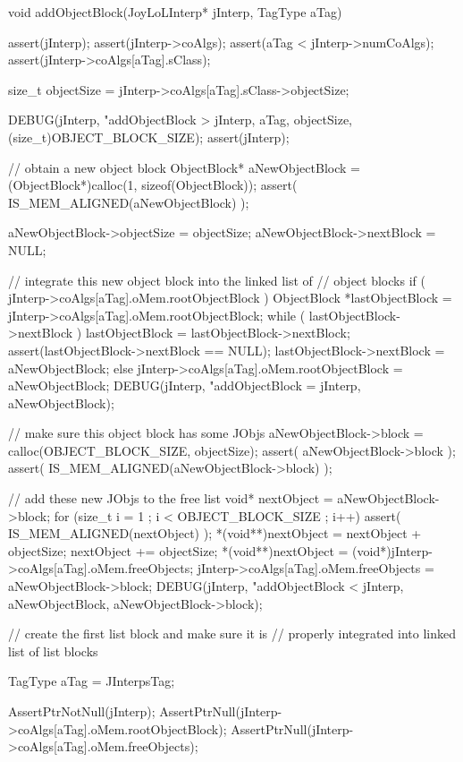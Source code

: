 \startCCode
void addObjectBlock(JoyLoLInterp* jInterp, TagType aTag) {
  assert(jInterp);
  assert(jInterp->coAlgs);
  assert(aTag < jInterp->numCoAlgs);
  assert(jInterp->coAlgs[aTag].sClass);

  size_t objectSize = jInterp->coAlgs[aTag].sClass->objectSize;

  DEBUG(jInterp, "addObjectBlock > %
    jInterp, aTag, objectSize, (size_t)OBJECT_BLOCK_SIZE);
  assert(jInterp);
  
  // obtain a new object block
  ObjectBlock* aNewObjectBlock = 
    (ObjectBlock*)calloc(1, sizeof(ObjectBlock));
  assert( IS_MEM_ALIGNED(aNewObjectBlock) );

  aNewObjectBlock->objectSize = objectSize;
  aNewObjectBlock->nextBlock  = NULL;
  
  // integrate this new object block into the linked list of
  // object blocks
  if ( jInterp->coAlgs[aTag].oMem.rootObjectBlock ) {
    ObjectBlock *lastObjectBlock = jInterp->coAlgs[aTag].oMem.rootObjectBlock;
    while ( lastObjectBlock->nextBlock ) {
      lastObjectBlock = lastObjectBlock->nextBlock;
    }
    assert(lastObjectBlock->nextBlock == NULL);
    lastObjectBlock->nextBlock = aNewObjectBlock;
  } else {
    jInterp->coAlgs[aTag].oMem.rootObjectBlock = aNewObjectBlock;
  }
  DEBUG(jInterp, "addObjectBlock = %
    jInterp, aNewObjectBlock);

  // make sure this object block has some JObjs
  aNewObjectBlock->block = 
    calloc(OBJECT_BLOCK_SIZE, objectSize);
  assert( aNewObjectBlock->block );
  assert( IS_MEM_ALIGNED(aNewObjectBlock->block) );
  
  // add these new JObjs to the free list
  void* nextObject = aNewObjectBlock->block;
  for (size_t i = 1 ; i < OBJECT_BLOCK_SIZE ; i++) {
    assert( IS_MEM_ALIGNED(nextObject) );
    *(void**)nextObject = nextObject + objectSize;
    nextObject += objectSize;
  }
  *(void**)nextObject =
    (void*)jInterp->coAlgs[aTag].oMem.freeObjects;
  jInterp->coAlgs[aTag].oMem.freeObjects = aNewObjectBlock->block;
  DEBUG(jInterp, "addObjectBlock < %
    jInterp, aNewObjectBlock, aNewObjectBlock->block);
}
\stopCCode

\startCTest
  // create the first list block and make sure it is 
  // properly integrated into linked list of list blocks

  TagType aTag = JInterpsTag;
    
  AssertPtrNotNull(jInterp);
  AssertPtrNull(jInterp->coAlgs[aTag].oMem.rootObjectBlock);
  AssertPtrNull(jInterp->coAlgs[aTag].oMem.freeObjects);

